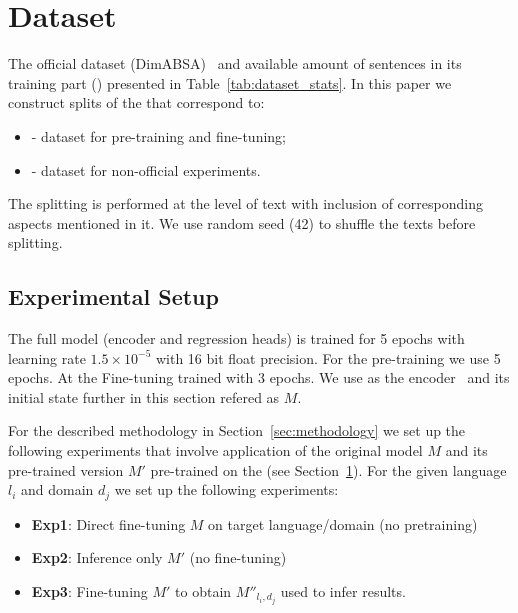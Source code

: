 \documentclass[11pt]{article}
\begin{document}





\section{Dataset}
\label{sec:dataset}

The official dataset (DimABSA)~\cite{lee2026dimabsabuildingmultilingualmultidomain,yu-etal-2026-semeval} and available amount of sentences in its training part (\dimabsaTrainData{})  presented in Table~\ref{tab:dataset_stats}.
In this paper we construct splits of the \dimabsaTrainData{} that correspond to: 
\begin{itemize}
    \item \dimabsaTrainActual{} - dataset for pre-training and fine-tuning;
    \item \dimabsaTrainEval{} - dataset for non-official experiments.
\end{itemize}
The splitting is performed at the level of text with inclusion of corresponding aspects mentioned in it. We use random seed (42) to shuffle the texts before splitting.

\subsection{Experimental Setup}

The full model (encoder and regression heads) is trained for 5 epochs with learning rate $1.5 \times 10^{-5}$ with 16 bit float precision. 
For the pre-training we use 5 epochs.
At the Fine-tuning trained with 3 epochs. 
We use \robertaBase{} as the encoder~\cite{liu2019robertarobustlyoptimizedbert} and its initial state further in this section refered as $M$.



For the described methodology in Section~\ref{sec:methodology} we set up the following experiments that involve application of the original model $M$ and its pre-trained version $M'$ pre-trained on the \dimabsaTrainActual{} (see Section~\ref{sec:dataset}).
For the given language $l_i$ and domain $d_j$ we set up the following experiments:
\begin{itemize}
    \item \textbf{Exp1}: Direct fine-tuning $M$ on target language/domain (no pretraining)
    \item \textbf{Exp2}: Inference only $M'$ (no fine-tuning)
    \item \textbf{Exp3}: Fine-tuning $M'$ to obtain $M''_{l_i,d_j}$ used to infer results. 
\end{itemize}
\end{document}
